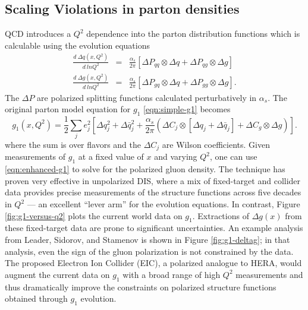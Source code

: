 \subsection{Scaling Violations in parton densities}

QCD introduces a \(Q^2\) dependence into the parton distribution functions which is calculable using the evolution equations
%
\begin{eqnarray}
  \frac{d~\Delta q(x,Q^2)}{d~ln Q^2} &=& \frac{\alpha_s}{2 \pi} \left[ \Delta P_{qq} \otimes \Delta q + \Delta P_{qg} \otimes \Delta g \right] \nonumber \\
  \frac{d~\Delta g(x,Q^2)}{d~ln Q^2} &=& \frac{\alpha_s}{2 \pi} \left[ \Delta P_{gq} \otimes \Delta q + \Delta P_{gg} \otimes \Delta g \right].
\end{eqnarray}
%
The \(\Delta P\) are polarized splitting functions calculated perturbatively in \(\alpha_s\).  The original parton model equation for \(g_1\) \ref{eqn:simple-g1} becomes
%
\begin{equation}
  g_1(x, Q^2) = \frac{1}{2} \sum_{j} e_j^2 \left[\Delta q_j^2 + \Delta \bar{q}_j^2 + \frac{\alpha_s}{2 \pi} \left(\Delta C_j \otimes \left[\Delta q_j + \Delta \bar{q}_j\right] + \Delta C_g \otimes \Delta g\right)\right].
  \label{eqn:enhanced-g1}
\end{equation}
%
where the sum is over flavors and the \(\Delta C_j\) are Wilson coefficients. Given measurements of \(g_1\) at a fixed value of \(x\) and varying \(Q^2\), one can use \ref{eqn:enhanced-g1} to solve for the polarized gluon density. The  technique has proven very effective in unpolarized DIS, where a mix of fixed-target and collider data provides precise measurements of the structure functions across five decades in \(Q^2\) --- an excellent ``lever arm'' for the evolution equations.  In contrast, Figure \ref{fig:g1-versus-q2} plots the current world data on \(g_1\).  Extractions of \(\Delta g(x)\) from these fixed-target data are prone to significant uncertainties.  An example analysis from Leader, Sidorov, and Stamenov is shown in Figure \ref{fig:g1-deltag}; in that analysis, even the sign of the gluon polarization is not constrained by the data. The proposed Electron Ion Collider (EIC), a polarized analogue to HERA, would augment the current data on \(g_1\) with a broad range of high \(Q^2\) measurements and thus dramatically improve the constraints on polarized structure functions obtained through \(g_1\) evolution.

